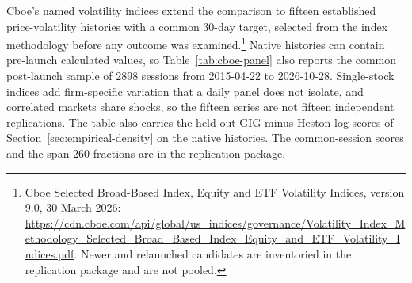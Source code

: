 Cboe's named volatility indices extend the comparison to fifteen established
price-volatility histories with a common 30-day target, selected from the index
methodology before any outcome was examined.\footnote{Cboe Selected Broad-Based
Index, Equity and ETF Volatility Indices, version 9.0, 30 March 2026:
\url{https://cdn.cboe.com/api/global/us_indices/governance/Volatility_Index_Methodology_Selected_Broad_Based_Index_Equity_and_ETF_Volatility_Indices.pdf}.
Newer and relaunched candidates are inventoried in the replication package and are not pooled.}
Native histories can contain pre-launch calculated values, so Table~\ref{tab:cboe-panel}
also reports the common post-launch sample of 2898 sessions from 2015-04-22 to 2026-10-28.
Single-stock indices add firm-specific variation that a daily panel does not
isolate, and correlated markets share shocks, so the fifteen series are not
fifteen independent replications. The table also carries the held-out GIG-minus-Heston
log scores of Section~\ref{sec:empirical-density} on the native histories. The
common-session scores and the span-260 fractions are in the replication package.

